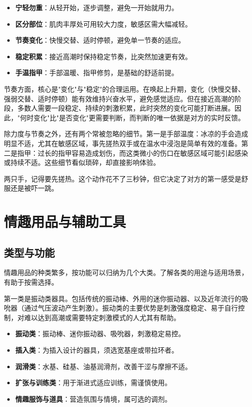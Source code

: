 \documentclass[12pt,UTF8]{ctexbook}
\newcommand{\keyword}[1]{\textbf{#1}}
\begin{document}
\begin{itemize}
	\item \keyword{宁轻勿重}：从轻开始，逐步调整，避免一开始就用力。
	\item \keyword{区分部位}：肌肉丰厚处可用较大力度，敏感区需大幅减轻。
	\item \keyword{节奏变化}：快慢交替、适时停顿，避免单一节奏的适应。
	\item \keyword{稳定积累}：接近高潮时保持稳定节奏，比突然加速更有效。
	\item \keyword{手温指甲}：手部温暖、指甲修剪，是基础的舒适前提。
\end{itemize}

节奏方面，核心是"变化"与"稳定"的合理运用。在唤起上升期，变化（快慢交替、强弱交替、适时停顿）能有效维持兴奋水平，避免感觉适应。但在接近高潮的阶段，多数人需要一段稳定、持续的刺激积累，此时突然的变化可能打断进展。因此，"何时变化"比"是否变化"更需要判断，而判断的唯一依据是对方的实时反馈。

除力度与节奏之外，还有两个常被忽略的细节。第一是手部温度：冰凉的手会造成明显不适，尤其在敏感区域，事先搓热双手或在温水中浸泡是简单有效的准备。第二是指甲：过长的指甲容易造成划伤，而这类微小的伤口在敏感区域可能引起感染或持续不适。这些细节看似琐碎，却直接影响体验。

\begin{tcolorbox}[colback=pink!5!white,colframe=red!50!black,title=贴心小叮咛]
	两只手，记得要先搓热。这个动作花不了三秒钟，但它决定了对方的第一感受是舒服还是被吓一跳。
\end{tcolorbox}

\section{情趣用品与辅助工具}
\subsection{类型与功能}

情趣用品的种类繁多，按功能可以归纳为几个大类。了解各类的用途与适用场景，有助于按需选择。

第一类是振动类器具。包括传统的振动棒、外用的迷你振动器、以及近年流行的吸吮器（通过气压波动产生刺激）。振动类的主要优势是刺激强度稳定、易于自行控制，对难以达到高潮或需要特定刺激模式的人尤其有帮助。

\begin{itemize}
	\item \keyword{振动类}：振动棒、迷你振动器、吸吮器，刺激稳定易控。
	\item \keyword{插入类}：为插入设计的器具，须选宽基座或带拉环者。
	\item \keyword{润滑类}：水基、硅基、油基润滑剂，改善干涩与摩擦不适。
	\item \keyword{扩张与训练类}：用于渐进式适应训练，需谨慎使用。
	\item \keyword{情趣服饰与道具}：营造氛围与情境，属可选的调剂。
\end{itemize}
\end{document}
